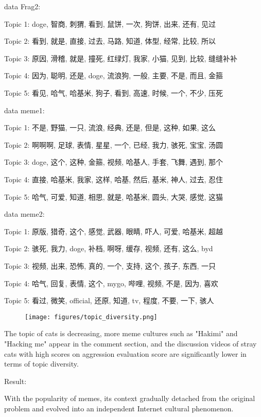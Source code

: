 \documentclass[12pt,a4paper]{ctexart}
\theoremstyle{MyLineTheoremStyle}
\theoremstyle{MyBlockTheoremStyle}
\theoremstyle{MySubsubsectionStyle}
\begin{document}
data Frag2:

Topic 1: doge, 智商, 刺猬, 看到, 鼠饼, 一次, 狗饼, 出来, 还有, 见过

Topic 2: 看到, 就是, 直接, 过去, 马路, 知道, 体型, 经常, 比较, 所以

Topic 3: 原因, 滑稽, 就是, 撞死, 红绿灯, 我家, 小猫, 见到, 比较, 缝缝补补

Topic 4: 因为, 聪明, 还是, doge, 流浪狗, 一般, 主要, 不是, 而且, 金箍

Topic 5: 看见, 哈气, 哈基米, 狗子, 看到, 高速, 时候, 一个, 不少, 压死

data meme1:

Topic 1: 不是, 野猫, 一只, 流浪, 经典, 还是, 但是, 这种, 如果, 这么

Topic 2: 啊啊啊, 足球, 表情, 星星, 一个, 已经, 我力, 骇死, 宝宝, 汤圆

Topic 3: doge, 这个, 这种, 金箍, 视频, 哈基人, 手套, 飞舞, 遇到, 那个

Topic 4: 直接, 哈基米, 我家, 这样, 哈基, 然后, 基米, 神人, 过去, 忍住

Topic 5: 哈气, 可爱, 知道, 相思, 就是, 哈基米, 圆头, 大哭, 感觉, 这猫

data meme2:

Topic 1: 原版, 猎奇, 这个, 感觉, 武器, 眼睛, 吓人, 可爱, 哈基米, 超越

Topic 2: 骇死, 我力, doge, 补档, 啊呀, 缓存, 视频, 还有, 这么, byd

Topic 3: 视频, 出来, 恐怖, 真的, 一个, 支持, 这个, 孩子, 东西, 一只

Topic 4: 哈气, 回复, 表情, 这个, mygo, 哔哩, 视频, 不是, 因为, 喜欢

Topic 5: 看过, 微笑, official, 还原, 知道, tv, 程度, 不要, 一下, 骇人

\begin{figure}[htbp]
    \centering
    \texttt{[image: figures/topic\_diversity.png]}
\end{figure}
\newpage

The topic of cats is decreasing, more meme cultures such as "Hakimi" and "Hacking me" appear in the comment section, and the discussion videos of stray cats with high scores on aggression evaluation score are significantly lower in terms of topic diversity.

Result:

With the popularity of memes, its context gradually detached from the original problem and evolved into an independent Internet cultural phenomenon.
\end{document}
